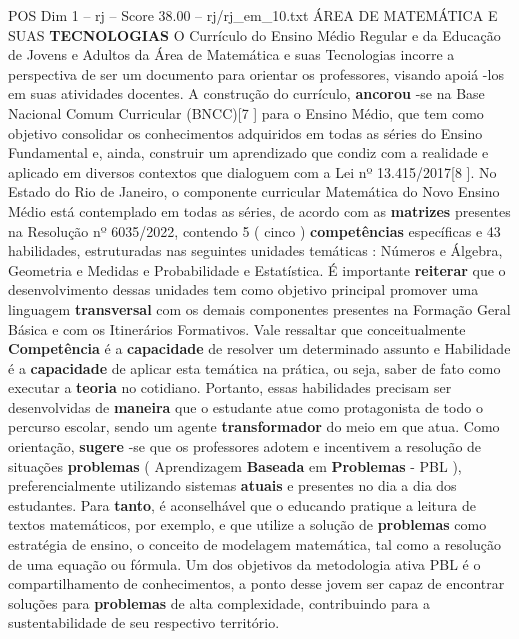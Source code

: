 \begin{textsample}{POS Dim 1 – rj – Score 38.00 – rj/rj\_em\_10.txt}  \label{ex:f1_pos_273}
ÁREA DE MATEMÁTICA E SUAS \textbf{TECNOLOGIAS} O Currículo do Ensino Médio Regular e da Educação de Jovens e Adultos da Área de Matemática e suas Tecnologias incorre a perspectiva de ser um documento para orientar os professores, visando apoiá -los em suas atividades docentes.
A construção do currículo, \textbf{ancorou} -se na Base Nacional Comum Curricular (BNCC)[7 ] para o Ensino Médio, que tem como objetivo consolidar os conhecimentos adquiridos em todas as séries do Ensino Fundamental e, ainda, construir um aprendizado que condiz com a realidade e aplicado em diversos contextos que dialoguem com a Lei nº 13.415/2017[8 ].
No Estado do Rio de Janeiro, o componente curricular Matemática do Novo Ensino Médio está contemplado em todas as séries, de acordo com as \textbf{matrizes} presentes na Resolução nº 6035/2022, contendo 5 ( cinco ) \textbf{competências} específicas e 43 habilidades, estruturadas nas seguintes unidades temáticas : Números e Álgebra, Geometria e Medidas e Probabilidade e Estatística.
É importante \textbf{reiterar} que o desenvolvimento dessas unidades tem como objetivo principal promover uma linguagem \textbf{transversal} com os demais componentes presentes na Formação Geral Básica e com os Itinerários Formativos.
Vale ressaltar que conceitualmente \textbf{Competência} é a \textbf{capacidade} de resolver um determinado assunto e Habilidade é a \textbf{capacidade} de aplicar esta temática na prática, ou seja, saber de fato como executar a \textbf{teoria} no cotidiano.
Portanto, essas habilidades precisam ser desenvolvidas de \textbf{maneira} que o estudante atue como protagonista de todo o percurso escolar, sendo um agente \textbf{transformador} do meio em que atua.
Como orientação, \textbf{sugere} -se que os professores adotem e incentivem a resolução de situações \textbf{problemas} ( Aprendizagem \textbf{Baseada} em \textbf{Problemas} - PBL ), preferencialmente utilizando sistemas \textbf{atuais} e presentes no dia a dia dos estudantes.
Para \textbf{tanto}, é aconselhável que o educando pratique a leitura de textos matemáticos, por exemplo, e que utilize a solução de \textbf{problemas} como estratégia de ensino, o conceito de modelagem matemática, tal como a resolução de uma equação ou fórmula.
Um dos objetivos da metodologia ativa PBL é o compartilhamento de conhecimentos, a ponto desse jovem ser capaz de encontrar soluções para \textbf{problemas} de alta complexidade, contribuindo para a sustentabilidade de seu respectivo território.

\end{textsample}
